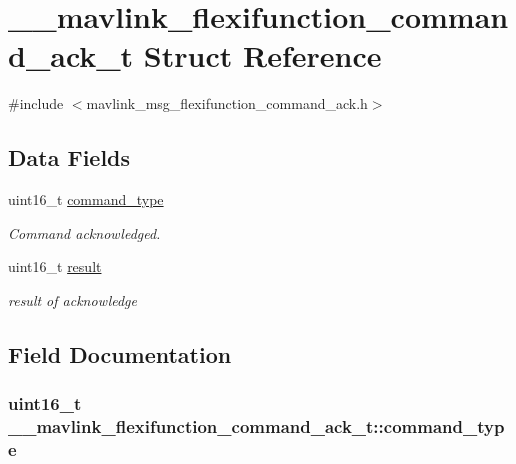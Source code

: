 \hypertarget{struct____mavlink__flexifunction__command__ack__t}{\section{\+\_\+\+\_\+mavlink\+\_\+flexifunction\+\_\+command\+\_\+ack\+\_\+t Struct Reference}
\label{struct____mavlink__flexifunction__command__ack__t}
}


{\ttfamily \#include $<$mavlink\+\_\+msg\+\_\+flexifunction\+\_\+command\+\_\+ack.\+h$>$}

\subsection*{Data Fields}
\begin{DoxyCompactItemize}
\item 
uint16\+\_\+t \hyperlink{struct____mavlink__flexifunction__command__ack__t_a12511b244a7c8d0b6b66582bfbf5555e}{command\+\_\+type}
\begin{DoxyCompactList}\small\item\em Command acknowledged. \end{DoxyCompactList}\item 
uint16\+\_\+t \hyperlink{struct____mavlink__flexifunction__command__ack__t_afe2b444356de2f5e2d3e7ddaad45d4c8}{result}
\begin{DoxyCompactList}\small\item\em result of acknowledge \end{DoxyCompactList}\end{DoxyCompactItemize}


\subsection{Field Documentation}
\hypertarget{struct____mavlink__flexifunction__command__ack__t_a12511b244a7c8d0b6b66582bfbf5555e}{
\subsubsection[{command\+\_\+type}]{\setlength{\rightskip}{0pt plus 5cm}uint16\+\_\+t \+\_\+\+\_\+mavlink\+\_\+flexifunction\+\_\+command\+\_\+ack\+\_\+t\+::command\+\_\+type}}\label{struct____mavlink__flexifunction__command__ack__t_a12511b244a7c8d0b6b66582bfbf5555e}


